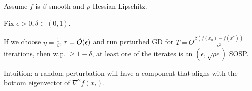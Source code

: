 \begin{theorem}
    Assume \(f\) is \(\beta\)-smooth and \(\rho\)-Hessian-Lipschitz. 

    Fix \(\epsilon > 0, \delta \in (0, 1)\). 

    If we choose \(\eta = \frac{1}{\beta}\), \(r = \Tilde{O}(\epsilon)\) and run perturbed GD for \(T = O\frac{\beta (f(x_0) - f(x^*))}{\epsilon^2}\) iterations, then w.p. \(\geq 1 - \delta\), at least one of the iterates is an \((\epsilon, \sqrt{\rho \epsilon})\) SOSP. 
\end{theorem}

\begin{remark}
    Intuition: a random perturbation will have a component that aligns with the bottom eigenvector of \(\nabla^2 f(x_t)\).     
\end{remark}

